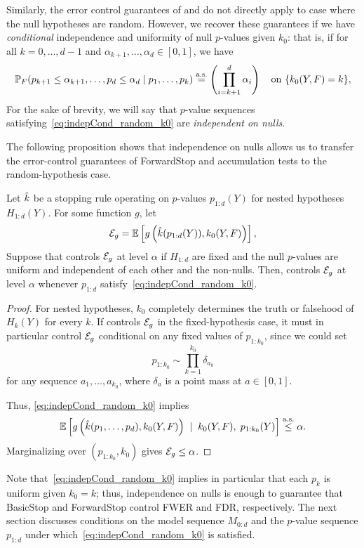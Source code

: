 \documentclass{article}
\begin{document}
Similarly, the error control guarantees of \citet{gsell2013sequential} and \citet{li2015accumulation} do not directly apply to case where the null hypotheses are random. However, we recover these guarantees if we have {\em conditional} independence and uniformity of null $p$-values given $k_0$: that is, if for all $k=0,\ldots, d-1$ and $\alpha_{k+1},\ldots,\alpha_{d} \in [0,1]$, we have
\begin{equation}\label{eq:indepCond_random_k0}
  \mathbb{P}_F(p_{k+1} \leq \alpha_{k+1}, \ldots, p_d \leq \alpha_d
  \mid p_1, \ldots, p_k) \overset{\textrm{a.s.}}{=} \left(\prod_{i=k+1}^d \alpha_i\right) \quad \text{on } \{k_0(Y, F) = k\},
\end{equation}
For the sake of brevity, we will say that $p$-value sequences satisfying~\eqref{eq:indepCond_random_k0} are {\em independent on nulls}.

The following proposition shows that independence on nulls allows us to transfer the error-control guarantees of ForwardStop and accumulation tests to the random-hypothesis case.
\begin{proposition}
  Let $\hk$ be a stopping rule operating on $p$-values $p_{1:d}(Y)$ for nested hypotheses $H_{1:d}(Y)$. For some function $g$, let
  \[
  \mathcal{E}_g = \mathbb{E}\left[ g\left(\hat{k}(p_{1:d}(Y)), k_0(Y, F)\right)\right],
  \]
  Suppose that \smash{$\hk$} controls $\mathcal{E}_g$ at level $\alpha$ if $H_{1:d}$ are fixed and the null $p$-values are uniform and independent of each other and the non-nulls. Then, \smash{$\hk$} controls $\mathcal{E}_g$ at level $\alpha$ whenever $p_{1:d}$ satisfy~\eqref{eq:indepCond_random_k0}.
\end{proposition}
\begin{proof}
    For nested hypotheses, $k_0$ completely determines the truth or falsehood of $H_k(Y)$ for every $k$. If \smash{$\hk$} controls $\mathcal{E}_g$ in the 
fixed-hypothesis case, it must in particular control $\mathcal{E}_g$ conditional on any fixed values of $p_{1:k_0}$, since we could set 
\[
p_{1:k_0} \sim \prod_{k=1}^{k_0} \delta_{a_k}
\]
for any sequence $a_1,\ldots, a_{k_0}$, where $\delta_a$ is a point mass at $a \in [0,1]$.

Thus, \eqref{eq:indepCond_random_k0} implies
  \[
  \mathbb{E}\left[ g\left(\hat{k}(p_1,\ldots,p_d), k_0(Y, F)\right) \;\mid\;
      k_0(Y, F), \; p_{1:k_0}(Y)\right] \overset{\textrm{a.s.}}{\leq} \alpha.
  \]
  Marginalizing over $(p_{1:k_0},k_0)$ gives $\mathcal{E}_g\leq \alpha$.
\end{proof}

Note that~\eqref{eq:indepCond_random_k0} implies in particular that each $p_k$ is uniform given $k_0=k$; thus, independence on nulls is enough to guarantee that BasicStop and ForwardStop control FWER and FDR, respectively. The next section discusses conditions on the model sequence $M_{0:d}$ and the $p$-value sequence $p_{1:d}$ under which~\eqref{eq:indepCond_random_k0} is satisfied.
\end{document}
